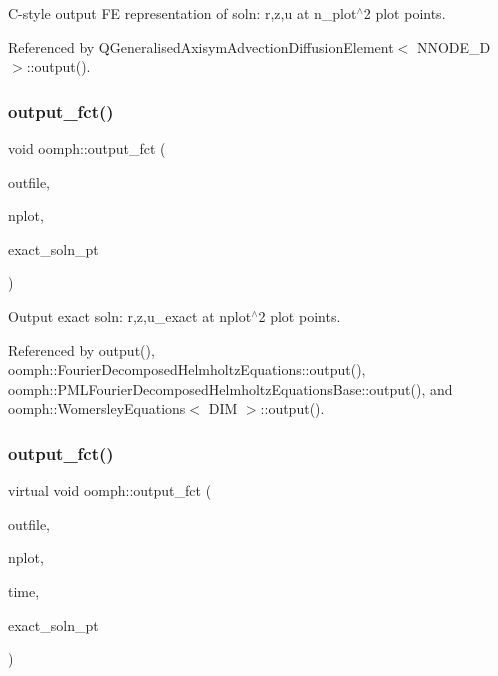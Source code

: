 C-\/style output FE representation of soln\+: r,z,u at n\+\_\+plot$^\wedge$2 plot points. 



Referenced by Q\+Generalised\+Axisym\+Advection\+Diffusion\+Element$<$ N\+N\+O\+D\+E\+\_\+D $>$\+::output().

\mbox{\label{namespaceoomph_af34df05c5bb9eca3576db493fb7d55ca}} 
\subsubsection{\texorpdfstring{output\+\_\+fct()}{output\_fct()}\hspace{0.1cm}{\footnotesize\ttfamily [1/2]}}
{\footnotesize\ttfamily void oomph\+::output\+\_\+fct (\begin{DoxyParamCaption}\item[{std\+::ostream \&}]{outfile,  }\item[{const unsigned \&}]{nplot,  }\item[{\hyperlink{classoomph_1_1FiniteElement_a690fd33af26cc3e84f39bba6d5a85202}{Finite\+Element\+::\+Steady\+Exact\+Solution\+Fct\+Pt}}]{exact\+\_\+soln\+\_\+pt }\end{DoxyParamCaption})}



Output exact soln\+: r,z,u\+\_\+exact at nplot$^\wedge$2 plot points. 



Referenced by output(), oomph\+::\+Fourier\+Decomposed\+Helmholtz\+Equations\+::output(), oomph\+::\+P\+M\+L\+Fourier\+Decomposed\+Helmholtz\+Equations\+Base\+::output(), and oomph\+::\+Womersley\+Equations$<$ D\+I\+M $>$\+::output().

\mbox{\label{namespaceoomph_a03bf88dd9de6857057781501ca5c066f}} 
\subsubsection{\texorpdfstring{output\+\_\+fct()}{output\_fct()}\hspace{0.1cm}{\footnotesize\ttfamily [2/2]}}
{\footnotesize\ttfamily virtual void oomph\+::output\+\_\+fct (\begin{DoxyParamCaption}\item[{std\+::ostream \&}]{outfile,  }\item[{const unsigned \&}]{nplot,  }\item[{const double \&}]{time,  }\item[{\hyperlink{classoomph_1_1FiniteElement_ad4ecf2b61b158a4b4d351a60d23c633e}{Finite\+Element\+::\+Unsteady\+Exact\+Solution\+Fct\+Pt}}]{exact\+\_\+soln\+\_\+pt }\end{DoxyParamCaption})\hspace{0.3cm}{\ttfamily [virtual]}}




